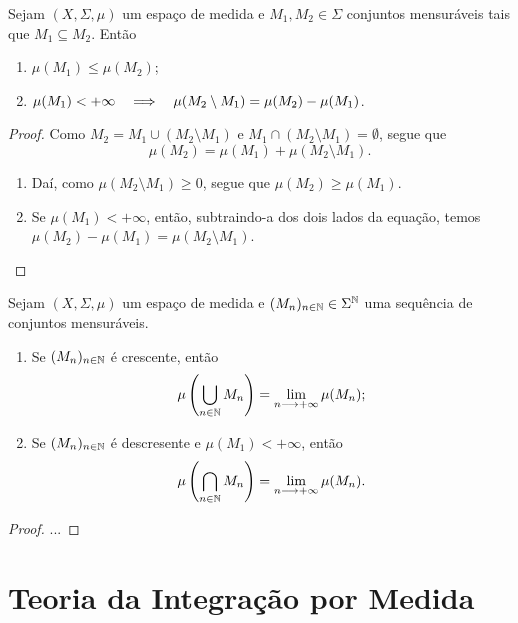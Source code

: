 \begin{prop}
Sejam $(X, \Sigma,\mu)$ um espaço de medida e $M_1,M_2 \in \Sigma$ conjuntos mensuráveis tais que $M_1 \subseteq M_2$. Então
	\begin{enumerate}
	\item $\mu(M_1) \leq \mu(M_2)$;
	\item $\mu(M_1) < + \infty \quad \Longrightarrow \quad \mu(M_2 \setminus M_1) = \mu(M_2) - \mu(M_1)$.
	\end{enumerate}
\end{prop}
\begin{proof}
	Como $M_2 = M_1 \cup (M_2 \setminus M_1)$ e $M_1 \cap (M_2 \setminus M_1) = \emptyset$, segue que
	\begin{equation*}
	\mu(M_2)=\mu(M_1)+\mu(M_2 \setminus M_1).
	\end{equation*}
	\begin{enumerate}
	\item Daí, como $\mu(M_2 \setminus M_1) \geq 0$, segue que $\mu(M_2) \geq \mu(M_1)$.
	\item Se $\mu(M_1) < + \infty$, então, subtraindo-a dos dois lados da equação, temos $\mu(M_2)-\mu(M_1)=\mu(M_2 \setminus M_1)$.
	\end{enumerate}
\end{proof}

\begin{prop}
Sejam $(X, \Sigma,\mu)$ um espaço de medida e $(M_n)_{n \in \mathbb{N}} \in \Sigma^{\mathbb{N}}$ uma sequência de conjuntos mensuráveis.
	\begin{enumerate}
	\item Se $(M_n)_{n \in \mathbb{N}}$ é crescente, então
		\begin{equation*}
		\mu \left( \bigcup_{n \in \mathbb{N}} M_n \right) = \lim_{n \longrightarrow +\infty} \mu(M_n);
		\end{equation*}
	\item Se $(M_n)_{n \in \mathbb{N}}$ é descresente e $\mu(M_1) < + \infty$, então
		\begin{equation*}
		\mu \left( \bigcap_{n \in \mathbb{N}} M_n \right) = \lim_{n \longrightarrow +\infty} \mu(M_n).
		\end{equation*}
	\end{enumerate}
\end{prop}
\begin{proof}
	...
\end{proof}





\chapter{Teoria da Integração por Medida}

